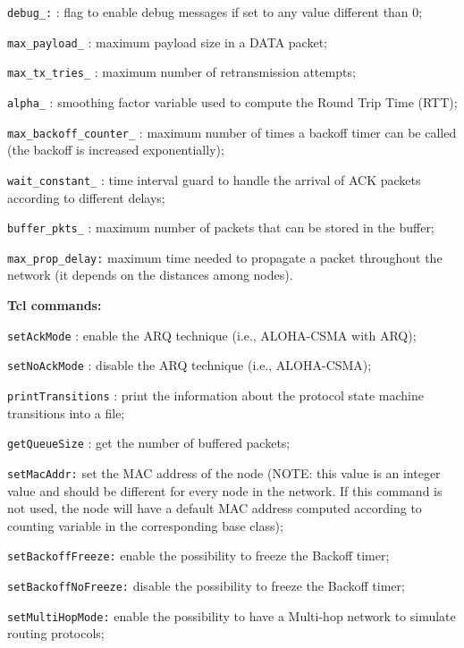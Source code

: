 \begin{description}
\begin{description}
   \item {\tt debug\_:} : flag to enable debug messages if set to any value different than $0$;
   \item {\tt max\_payload\_} : maximum payload size in a DATA packet;
   \item {\tt max\_tx\_tries\_} : maximum number of retransmission attempts;
   \item {\tt alpha\_} : smoothing factor variable used to compute the Round Trip Time (RTT);
   \item {\tt max\_backoff\_counter\_} : maximum number of times a backoff timer can be called (the backoff is increased exponentially);
   \item {\tt wait\_constant\_} : time interval guard to handle the arrival of ACK packets according to different delays;   
   \item {\tt buffer\_pkts\_} : maximum number of packets that can be stored in the buffer; 
   \item {\tt max\_prop\_delay:} maximum time needed to propagate a packet throughout the network (it depends on the distances among nodes).
   \end{description}
   \item {\bf Tcl commands:}
   \begin{description}
      \item {\tt setAckMode} : enable the ARQ technique (i.e., ALOHA-CSMA with ARQ);
      \item {\tt setNoAckMode} : disable the ARQ technique (i.e., ALOHA-CSMA); 
      \item {\tt printTransitions} : print the information about the protocol state machine transitions into a file;	
      \item {\tt getQueueSize} : get the number of buffered packets;
      \item {\tt setMacAddr:} set the MAC address of the node (NOTE: this value is an integer value and should be different for every node in the network. If this command is not used, the node will have a default MAC address computed according to counting variable in the corresponding base class);
	   \item {\tt setBackoffFreeze:} enable the possibility to freeze the Backoff timer;
	   \item {\tt setBackoffNoFreeze:} disable the possibility to freeze the Backoff timer;
	   \item {\tt setMultiHopMode:} enable the possibility to have a Multi-hop network to simulate routing protocols;

\end{description}
\end{description}
